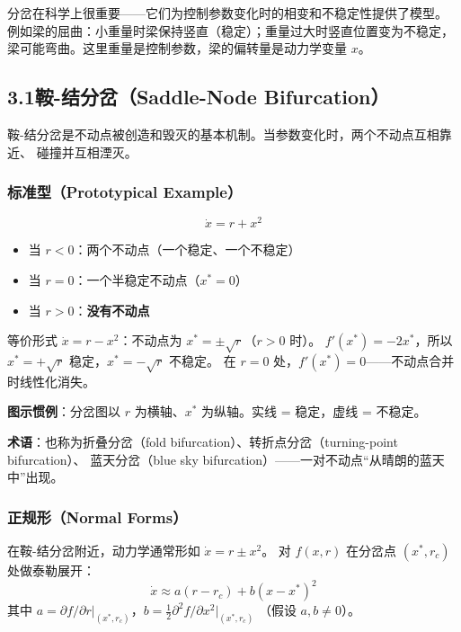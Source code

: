 \documentclass[12pt,a4paper]{article}
\begin{document}
分岔在科学上很重要——它们为控制参数变化时的相变和不稳定性提供了模型。
例如梁的屈曲：小重量时梁保持竖直（稳定）；重量过大时竖直位置变为不稳定，
梁可能弯曲。这里重量是控制参数，梁的偏转量是动力学变量 $x$。

\subsection{3.1\quad 鞍-结分岔（Saddle-Node Bifurcation）}

鞍-结分岔是不动点被创造和毁灭的基本机制。当参数变化时，两个不动点互相靠近、
碰撞并互相湮灭。

\subsubsection{标准型（Prototypical Example）}
\begin{equation}
\dot{x} = r + x^2
\end{equation}

\begin{itemize}[nosep]
  \item 当 $r < 0$：两个不动点（一个稳定、一个不稳定）
  \item 当 $r = 0$：一个半稳定不动点（$x^* = 0$）
  \item 当 $r > 0$：\textbf{没有不动点}
\end{itemize}

等价形式 $\dot{x} = r - x^2$：不动点为 $x^* = \pm\sqrt{r}$（$r > 0$ 时）。
$f'(x^*) = -2x^*$，所以 $x^* = +\sqrt{r}$ 稳定，$x^* = -\sqrt{r}$ 不稳定。
在 $r = 0$ 处，$f'(x^*) = 0$——不动点合并时线性化消失。

\textbf{图示惯例}：分岔图以 $r$ 为横轴、$x^*$ 为纵轴。实线 = 稳定，虚线 = 不稳定。

\textbf{术语}：也称为折叠分岔（fold bifurcation）、转折点分岔（turning-point bifurcation）、
蓝天分岔（blue sky bifurcation）——一对不动点``从晴朗的蓝天中''出现。

\subsubsection{正规形（Normal Forms）}
在鞍-结分岔附近，动力学通常形如 $\dot{x} = r \pm x^2$。
对 $f(x,r)$ 在分岔点 $(x^*, r_c)$ 处做泰勒展开：
\begin{equation}
\dot{x} \approx a(r - r_c) + b(x - x^*)^2
\end{equation}
其中 $a = \partial f/\partial r|_{(x^*,r_c)}$，$b = \frac{1}{2} \partial^2 f/\partial x^2|_{(x^*,r_c)}$
（假设 $a, b \neq 0$）。
\end{document}
